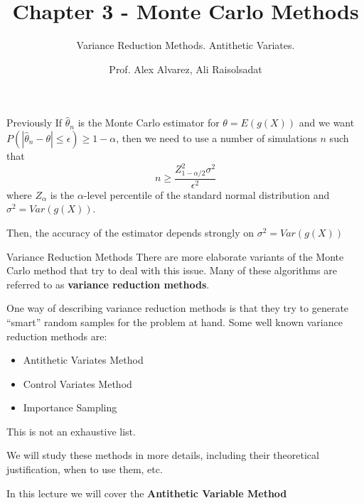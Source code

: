 \documentclass[8pt]{beamer}
\title{Chapter 3 - Monte Carlo Methods}
\subtitle{Variance Reduction Methods. Antithetic Variates.}
\author{Prof. Alex Alvarez, Ali Raisolsadat}
\institute{School of Mathematical and Computational Sciences \\ University of Prince Edward Island}
\date{} %
\begin{document}
\maketitle

\begin{frame}{Previously}
If $\hat{\theta}_n$ is the Monte Carlo estimator for $\theta=E(g(X))$ and we want $P\left(|\hat{\theta}_n-\theta|\leq \epsilon\right)\geq 1-\alpha$, then we need to use a number of simulations $n$ such that
\begin{equation*}
n \geq \frac{Z_{1-\alpha/2}^2\sigma^2}{\epsilon ^2}
\end{equation*}
where $Z_{\alpha}$ is the $\alpha$-level percentile of the standard normal distribution and $\sigma^2=Var(g(X))$.

\vspace{2mm}

Then, the accuracy of the estimator depends strongly on $\sigma^2=Var(g(X))$
\end{frame}

\begin{frame}{Variance Reduction Methods}
There are more elaborate variants of the Monte Carlo method that try to deal with this issue. Many of these algorithms are referred to as \textbf{variance reduction methods}.
 
One way of describing   variance reduction methods is that they try to generate  ``smart'' random samples for the problem at hand. Some well known variance reduction methods are:

\begin{itemize}
	\item Antithetic Variates Method
	\item Control Variates Method
	\item Importance Sampling 
\end{itemize}

This is not an exhaustive list. 

\vspace{3mm}

We will study these methods in more details, including their theoretical justification, when to use them, etc.

\vspace{3mm}

In this lecture we will cover the \textbf{Antithetic Variable Method}
\end{frame}
\end{document}
